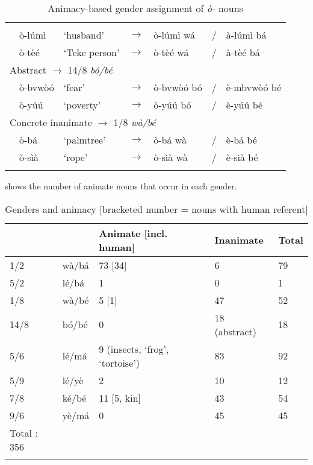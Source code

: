 \documentclass[output=paper,,modfonts,nonflat]{langsci/langscibook}
\begin{document}
\begin{table}[!htbp]
\caption{Animacy-based gender assignment of \textit{ò-} nouns}
\label{table14}
\begin{small}
\begin{tabular}{l		l		l		l		l		l		l}
\lsptoprule	
	\multicolumn{7}{l}{Animate $\rightarrow$ 1/2 \textit{wà/bá}}											\\
	& ò-lúmì	&	‘husband’	&	$\rightarrow$	&	ò-lúmì wá	&	/	&	à-lúmì bá	\\
	& ò-tèé	&	‘Teke person’	&	$\rightarrow$	&	ò-tèé wá	&	/	&	à-tèé bá	\\ [0.2cm]
	\multicolumn{7}{l}{Abstract $\rightarrow$ 14/8 \textit{bó/bé}}											\\
	& ò-bvwòó	&	‘fear’	&	$\rightarrow$	&	ò-bvwòó bó	&	/	&	è-mbvwòó bé	\\
	& ò-yúú	&	‘poverty’	&	$\rightarrow$	&	ò-yúú bó	&	/	&	è-yúú bé	\\ [0.2cm]
	\multicolumn{7}{l}{Concrete inanimate $\rightarrow$ 1/8 \textit{wà/bé}}											\\
	& ò-bá	&	‘palmtree’	&	$\rightarrow$	&	ò-bá wà	&	/	&	è-bá bé	\\
	& ò-sìà	&	‘rope’	&	$\rightarrow$	&	ò-sìà wà	&	/	&	è-sìà bé	\\
  \lspbottomrule
\end{tabular}
\end{small}
\end{table}

 shows the number of animate nouns that occur in each gender.

\begin{table}[!htbp]
\caption{Genders and animacy [bracketed number = nouns with human referent]}
\label{table15}
\begin{small}
\begin{tabular}{l		l		l		l		l	}
\lsptoprule	
	&		&	Animate [incl. human] 	&	Inanimate	&	Total	\\
\midrule									
1/2	&	wà/bá	&	\cellcolor{gray!60}73 [34]	&	6	&	79	\\
5/2	&	lé/bá	&	\cellcolor{gray!60}1	&	0	&	1	\\
1/8	&	wà/bé	&	5 [1]	&	\cellcolor{gray!60}47	&	52	\\
14/8	&	bó/bé	&	0	&	\cellcolor{gray!60}18 (abstract)	&	18	\\
5/6	&	lé/má	&	9 (insects, ‘frog’, ‘tortoise’)	&	\cellcolor{gray!60}83	&	92	\\
5/9	&	lé/yè	&	2	&	\cellcolor{gray!60}10	&	12	\\
7/8	&	ké/bé	&	11 [5, kin]	&	\cellcolor{gray!60}43	&	54	\\
9/6	&	yè/má	&	0	&	\cellcolor{gray!60}45	&	45	\\
						Total :		356	\\
\lspbottomrule
\end{tabular}
\end{small}
\end{table}
\end{document}
